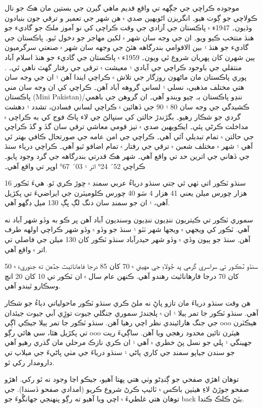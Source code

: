 \documentclass[a4paper]{article}
\begin{document}
موجوده ڪراچي جي جڳهه تي واقع قديم ماهي گيرن جي بستين مان هڪ جو نال ڪولاچي جو ڳوٺ هيو۔ انگريزن اڻويهين صدي ۾ هن شهر جي تعمير و ترقي جون بنيادون وڌيون۔ 1947ء ۾ پاڪستان جي آزادي جي وقت ڪراچی کي نو آموز ملڪ جو گاديء جو هنڌ منتخب ڪيو ويو۔ ان جي وجه سان شهر ۾ لکين مهاجر جو دخول ٿيو۔ پاڪستان جي گاديء جو هنڌ ۽ بين الاقوامي بندرگاهه هئڻ جي وجهه سان شهر ۾ صنعتي سرگرميون ٻين شهرن کان پهريان شروع ٿي ويون۔ 1959ء ۾ پاڪستان جي گاديء جو هنڌ اسلام آباد منتقلي جي باوجود ڪراچي جي آبادي ۽ معيشت ۾ ترقی جي رفتار گهٽ ناهي ٿي۔ . پوري پاڪستان مان ماڻهون روزگار جي تلاش ۾ ڪراچي ايندا آهن ۽ ان جي وجه سان هتي مختلف مذهبي، نسلي ۽ لساني گروهه آباد آهن۔ ڪراچي کي ان وجه سان مني پاڪستان (Mini Pakistan)/ننڍو پاڪستان بہ چيو ويندو آهي۔ ان گروهن جي باهمي ڪشيدگي جي وجه سان 80 ۽ 90 جي ڏهائين ۾ ڪراچي لساني فسادن، تشدد ۽ دهشت گردي جو شڪار رهيو۔ بگڙندڙ حالتن کي سنڀالڻ جي لاء پاڪ فوج کي به ڪراچی ۾ مداخلت ڪرڻي پئي۔ ايڪويهين صدي ۾ تيز قومي معاشي ترقي سان گڏ و گڏ ڪراچي جي حالتن ۾ تمام تبديلي آئي آهي۔ ڪراچي جي امن عامه جي صورتحال ڪافي بهتر ٿي آهي ۽ شهر ۾ مختلف شعبن ۾ ترقي جي رفتار ۾ تمام اضافو ٿيو آهي۔ ڪراچي درياء سنڌ جي ڏهاني جي اترين حد تي واقع آهي۔ شهر هڪ قدرتي بندرگاهه جي گرد وجود پايو۔ ڪراچي 52´ 24° اتر ۽ 03´ 67° اوڀر تي واقع آهي۔

سنڌو ٽڪور اتي ٺهي ٿي جتي سنڌو درياءُ عربي سمنڊ ۾ ڇوڙ ڪري ٿو. هيءَ ٽڪور 16 هزار چورس ميلن يعني 41 هزار 4 سَو 40 چورس ڪلوميٽرن جي ايراضيءَ تي پکڙيل آهي، ۽ ان جو سمنڊ سان دنگ لڳ ڀڳ 130 ميل ڊگھو آهي.

سموري ٽڪور تي ڪيتريون ننڍيون ننڍيون وسنديون آباد آهن پر ڪو به وڏو شهر آباد نه آهي. ٽڪور کي ويجھي ۾ ويجھا شهر ٺٽو ۽ سنڌ جو وڏو ۾ وڏو شهر ڪراچي اولهه طرف آهن. سنڌ جو ٻيون وڏي ۾ وڏو شهر حيدرآباد سنڌو ٽڪور کان 130 ميلن جي فاصلي تي اتر ۾ واقع آهي.

سنڌو ٽڪور تي سراسري گرمي پد جُولاءِ جي مهيني ۾ 70 کان 85 درجا فاهانائيٽ جڏهن ته جنوريءَ ۾ 50 کان 70 درجا فارهانائيٽ رهندو آهي. ڪنهن عام سال ۾ ان ٽڪور تي 10 کان 20 انچ وسڪارو ٿيندو آهي.

هن وقت سنڌو درياءَ مان تازو پاڻِ نه ملڻ ڪري سنڌو ٽڪور ماحولياتي دٻاءُ جو شڪار آهي. سنڌو ٽڪور جا تمر ٻيلا ۽ ان ۾ پلجندڙ سموري جنگلي جيوت توڙِي آبي جيوت جيئدان جي جنگ هارائيندي نظر اچي رهيا آهن. سنڌو ٽڪور جا تمر ٻيلا جيڪي اڳي ooo هيڪٽرن تي پکڙيل هئا، سي هائي رڳو ooo هيٽرن تائين محدود رهجي ويا آهن. ساڳيءَ ريت جھينگي ۽ پلي جو نسل پڻ خطري ۾ آهي ۽ ان ڪري نازڪ مرحلي مان گذري رهيو آهي جو سندن جياپو سمنڊ جي کاري پاڻي ۽ سنڌو درياءَ جي مٺي پاڻيءَ جي ميلاپ تي دارومدار رکي ٿو.

توهان اهڙي صفحي جو ڳنڍڻو وٺي هتي پهتا آهيو، جيڪو اڃا وجود نه ٿو رکي. اهڙو صفحو جوڙڻ لاءِ هيٺين باڪس ۾ ٽائيپ ڪرڻ شروع ڪريو (امدادي صفحو ڏسندا). جي توهان هتي غلطيءَ ۾ اچي ويا آهيو ته رڳو پنهنجي جهانگُوءَ جو back بٽڻ ڪلڪ ڪندا.
\end{document}
